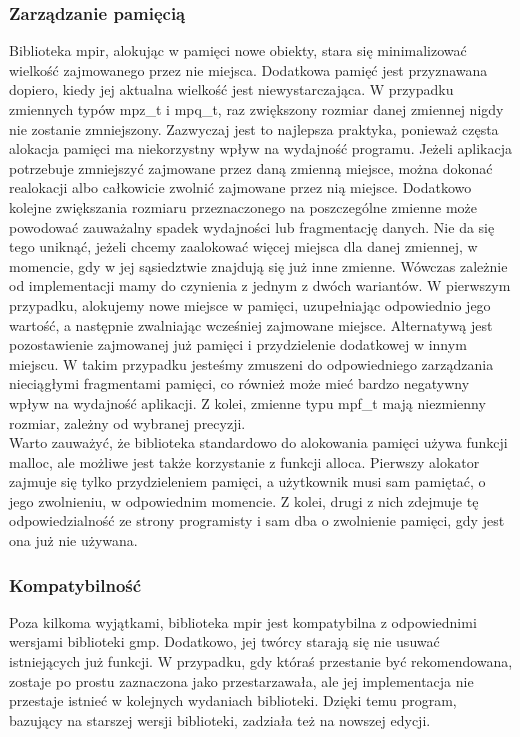 \documentclass[twoside,a4paper]{book}
\begin{document}
\subsubsection{Zarządzanie pamięcią}
Biblioteka mpir, alokując w pamięci nowe obiekty, stara się minimalizować wielkość zajmowanego przez nie miejsca. Dodatkowa pamięć jest przyznawana dopiero, kiedy jej aktualna wielkość jest niewystarczająca. W przypadku zmiennych typów mpz\_t i mpq\_t, raz zwiększony rozmiar danej zmiennej nigdy nie zostanie zmniejszony. Zazwyczaj jest to najlepsza praktyka, ponieważ częsta alokacja pamięci ma niekorzystny wpływ na wydajność programu. Jeżeli aplikacja potrzebuje zmniejszyć zajmowane przez daną zmienną miejsce, można dokonać realokacji albo całkowicie zwolnić zajmowane przez nią miejsce. Dodatkowo kolejne zwiększania rozmiaru przeznaczonego na poszczególne zmienne może powodować zauważalny spadek wydajności lub fragmentację danych. Nie da się tego uniknąć, jeżeli chcemy zaalokować więcej miejsca dla danej zmiennej, w momencie, gdy w jej sąsiedztwie znajdują się już inne zmienne. Wówczas zależnie od implementacji mamy do czynienia z jednym z dwóch wariantów. W pierwszym przypadku, alokujemy nowe miejsce w pamięci, uzupełniając odpowiednio jego wartość, a następnie zwalniając wcześniej zajmowane miejsce. Alternatywą jest pozostawienie zajmowanej już pamięci i przydzielenie dodatkowej w innym miejscu. W takim przypadku jesteśmy zmuszeni do odpowiedniego zarządzania nieciągłymi fragmentami pamięci, co również może mieć bardzo negatywny wpływ na wydajność aplikacji. Z kolei, zmienne typu mpf\_t mają niezmienny rozmiar, zależny od wybranej precyzji. \\
Warto zauważyć, że biblioteka standardowo do alokowania pamięci używa funkcji malloc, ale możliwe jest także korzystanie z funkcji alloca. Pierwszy alokator zajmuje się tylko przydzieleniem pamięci, a użytkownik musi sam pamiętać, o jego zwolnieniu, w odpowiednim momencie. Z kolei, drugi z nich zdejmuje tę odpowiedzialność ze strony programisty i sam dba o zwolnienie pamięci, gdy jest ona już nie używana.

\subsubsection{Kompatybilność}
Poza kilkoma wyjątkami, biblioteka mpir jest kompatybilna z odpowiednimi wersjami biblioteki gmp. Dodatkowo, jej twórcy starają się nie usuwać istniejących już funkcji. W przypadku, gdy któraś przestanie być rekomendowana, zostaje po prostu zaznaczona jako przestarzawała, ale jej implementacja nie przestaje istnieć w kolejnych wydaniach biblioteki. Dzięki temu program, bazujący na starszej wersji biblioteki, zadziała też na nowszej edycji.
\end{document}
